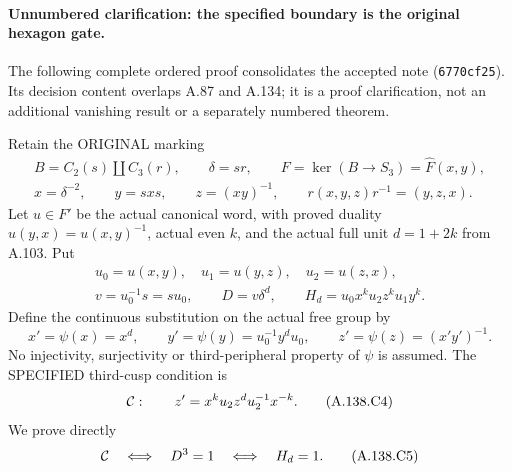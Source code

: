 \paragraph{Unnumbered clarification: the specified boundary is the
original hexagon gate.}
The following complete ordered proof consolidates the accepted
note 
(\texttt{6770cf25}). Its decision content overlaps A.87 and
A.134; it is a proof clarification, not an additional vanishing
result or a separately numbered theorem.

Retain the ORIGINAL marking
\[
\begin{gathered}
 B=C_2(s)\amalg C_3(r),\qquad \delta=sr,\qquad
 F=\ker(B\to S_3)=\widehat F(x,y),\\
 x=\delta^{-2},\qquad y=sxs,\qquad z=(xy)^{-1},\qquad
 r(x,y,z)r^{-1}=(y,z,x).
\end{gathered}
\tag{A.138.C1}
\]
Let \(u\in F'\) be the actual canonical word, with proved
duality \(u(y,x)=u(x,y)^{-1}\), actual even \(k\), and
the actual full unit \(d=1+2k\) from A.103. Put
\[
\begin{gathered}
 u_0=u(x,y),\quad u_1=u(y,z),\quad u_2=u(z,x),\\
 v=u_0^{-1}s=su_0,\qquad D=v\delta^d,\qquad
 H_d=u_0x^k u_2z^k u_1y^k.
\end{gathered}
\tag{A.138.C2}
\]
Define the continuous substitution on the actual free group by
\[
 x'=\psi(x)=x^d,\qquad
 y'=\psi(y)=u_0^{-1}y^du_0,\qquad
 z'=\psi(z)=(x'y')^{-1}.
\tag{A.138.C3}
\]
No injectivity, surjectivity or third-peripheral property of
\(\psi\) is assumed. The SPECIFIED third-cusp condition is
\[
 {\cal C}:\qquad z'=x^k u_2z^d u_2^{-1}x^{-k}.
\tag{A.138.C4}
\]
We prove directly
\[
             {\cal C}\quad\Longleftrightarrow\quad
             D^3=1\quad\Longleftrightarrow\quad H_d=1 .
\tag{A.138.C5}
\]

